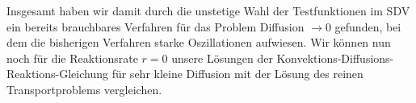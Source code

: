 \begin{figure}[H]
\end{figure}

Insgesamt haben wir damit durch die unstetige Wahl der Testfunktionen im SDV ein bereits brauchbares Verfahren für das Problem Diffusion $\to 0$ gefunden, bei dem die bisherigen Verfahren  starke Oszillationen aufwiesen. 
Wir können nun noch für die Reaktionsrate $r=0$ unsere Lösungen der Konvektions-Diffusions-Reaktions-Gleichung für sehr kleine Diffusion mit der Lösung des reinen Transportproblems vergleichen.
